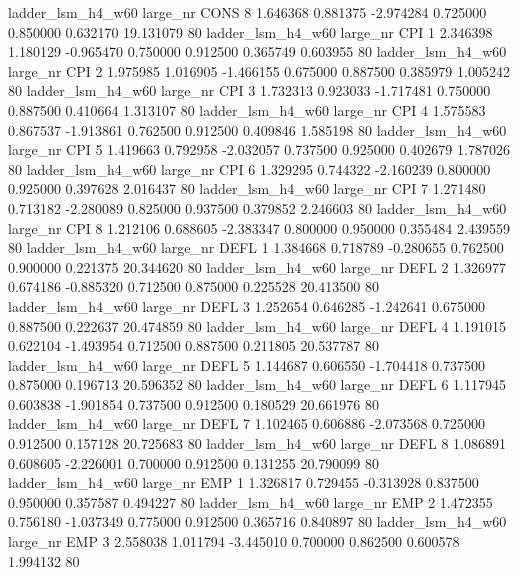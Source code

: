   ladder_lsm_h4_w60   large_nr     CONS                 8  1.646368  0.881375  -2.974284 0.725000 0.850000  0.632170   19.131079 80
  ladder_lsm_h4_w60   large_nr      CPI                 1  2.346398  1.180129  -0.965470 0.750000 0.912500  0.365749    0.603955 80
  ladder_lsm_h4_w60   large_nr      CPI                 2  1.975985  1.016905  -1.466155 0.675000 0.887500  0.385979    1.005242 80
  ladder_lsm_h4_w60   large_nr      CPI                 3  1.732313  0.923033  -1.717481 0.750000 0.887500  0.410664    1.313107 80
  ladder_lsm_h4_w60   large_nr      CPI                 4  1.575583  0.867537  -1.913861 0.762500 0.912500  0.409846    1.585198 80
  ladder_lsm_h4_w60   large_nr      CPI                 5  1.419663  0.792958  -2.032057 0.737500 0.925000  0.402679    1.787026 80
  ladder_lsm_h4_w60   large_nr      CPI                 6  1.329295  0.744322  -2.160239 0.800000 0.925000  0.397628    2.016437 80
  ladder_lsm_h4_w60   large_nr      CPI                 7  1.271480  0.713182  -2.280089 0.825000 0.937500  0.379852    2.246603 80
  ladder_lsm_h4_w60   large_nr      CPI                 8  1.212106  0.688605  -2.383347 0.800000 0.950000  0.355484    2.439559 80
  ladder_lsm_h4_w60   large_nr     DEFL                 1  1.384668  0.718789  -0.280655 0.762500 0.900000  0.221375   20.344620 80
  ladder_lsm_h4_w60   large_nr     DEFL                 2  1.326977  0.674186  -0.885320 0.712500 0.875000  0.225528   20.413500 80
  ladder_lsm_h4_w60   large_nr     DEFL                 3  1.252654  0.646285  -1.242641 0.675000 0.887500  0.222637   20.474859 80
  ladder_lsm_h4_w60   large_nr     DEFL                 4  1.191015  0.622104  -1.493954 0.712500 0.887500  0.211805   20.537787 80
  ladder_lsm_h4_w60   large_nr     DEFL                 5  1.144687  0.606550  -1.704418 0.737500 0.875000  0.196713   20.596352 80
  ladder_lsm_h4_w60   large_nr     DEFL                 6  1.117945  0.603838  -1.901854 0.737500 0.912500  0.180529   20.661976 80
  ladder_lsm_h4_w60   large_nr     DEFL                 7  1.102465  0.606886  -2.073568 0.725000 0.912500  0.157128   20.725683 80
  ladder_lsm_h4_w60   large_nr     DEFL                 8  1.086891  0.608605  -2.226001 0.700000 0.912500  0.131255   20.790099 80
  ladder_lsm_h4_w60   large_nr      EMP                 1  1.326817  0.729455  -0.313928 0.837500 0.950000  0.357587    0.494227 80
  ladder_lsm_h4_w60   large_nr      EMP                 2  1.472355  0.756180  -1.037349 0.775000 0.912500  0.365716    0.840897 80
  ladder_lsm_h4_w60   large_nr      EMP                 3  2.558038  1.011794  -3.445010 0.700000 0.862500  0.600578    1.994132 80
